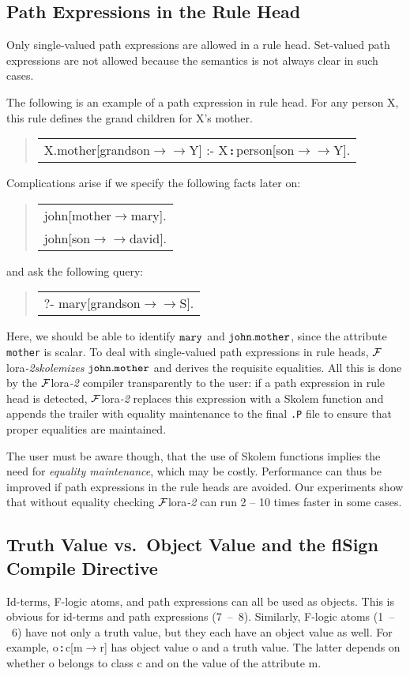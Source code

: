 \documentclass[11pt]{article}
\newenvironment{qrules}{\begin{quote}\sf\begin{tabular}[t]{l}}%
{\end{tabular}\end{quote}}
\newcommand{\isa}{\,{\bf{:}}\,}
\newcommand{\fd}{\ensuremath{{\rightarrow}}}                   %
\newcommand{\mvd}{\ensuremath{{\rightarrow\!\!\!\!\rightarrow}}}  %
\newcommand{\FLORA}{{\mbox{${\cal F}${\sc lora}\rm\emph{-2}}}\xspace}
\newcommand{\fl}{\mbox{F-logic}\xspace}
\begin{document}
\subsection{Path Expressions in the Rule Head}


Only single-valued path expressions are allowed in a rule head. Set-valued
path expressions are not allowed because the semantics is not always clear
in such cases.

The following is an example of a path expression in rule head. For any
person X, this rule defines the grand children for X's mother.
\begin{qrules}
X.mother[grandson{\mvd}Y] :- X{\isa}person[son{\mvd}Y].
\end{qrules}
Complications arise if we specify the following facts later on:
\begin{qrules}
john[mother{\fd}mary]. \\
john[son{\mvd}david].
\end{qrules}
and ask the following query:
\begin{qrules}
?- mary[grandson{\mvd}S].
\end{qrules}

Here, we should be able to identify ${\tt mary}$ and ${\tt john.mother}$,
since the attribute {\tt mother} is scalar. To deal with single-valued path
expressions in rule heads, \FLORA \emph{skolemizes} ${\tt john.mother}$ and
derives the requisite equalities.  All this is done by the
\FLORA compiler transparently to the user: if a path expression in rule head
is detected, \FLORA replaces this expression with a Skolem function and
appends the trailer with equality maintenance to the final {\tt .P} file
to ensure that proper equalities are maintained.

The user must be aware though, that the use of Skolem functions implies
the need for \emph{equality maintenance}, which may be costly.  Performance can
thus be improved if path expressions in the rule heads are avoided.  Our
experiments show that without equality checking \FLORA can run 2 -- 10 times
faster in some cases.


\subsection{Truth Value vs.\ Object Value and the flSign Compile Directive}\label{sec-references}


Id-terms, \fl atoms, and path expressions can all be used 
as objects. This is obvious for id-terms and path
expressions (7~--~8). Similarly, \fl atoms (1~--~6) have not only a
truth value, but they each have an object value as well.
For example, {\sf o{\isa}c[m{\fd}r]} has object value {\sf o} and a truth value.
The latter depends on whether {\sf o} belongs to class {\sf c} and on the value of
the attribute {\sf m}.
\end{document}
